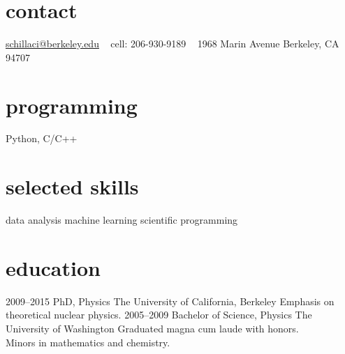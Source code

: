 \documentclass[]{friggeri-cv} %
\begin{document}


\begin{aside} %
\section{contact}
\href{mailto:schillaci@berkeley.edu}{schillaci@berkeley.edu}
~
cell: 206-930-9189
~
1968 Marin Avenue
Berkeley, CA 94707
\section{programming}
Python, C/C++
\section{selected skills}
data analysis
machine learning
scientific programming
\end{aside}


\section{education}

\begin{entrylist}
\entry
{2009--2015}
{PhD, {\normalfont  Physics}}
{The University of California, Berkeley}
{Emphasis on theoretical nuclear physics.}
\entry
{2005--2009}
{Bachelor of Science, {\normalfont Physics}}
{The University of Washington}
{Graduated magna cum laude with honors.\\ Minors in mathematics and chemistry.}
\end{entrylist}

\end{document}
